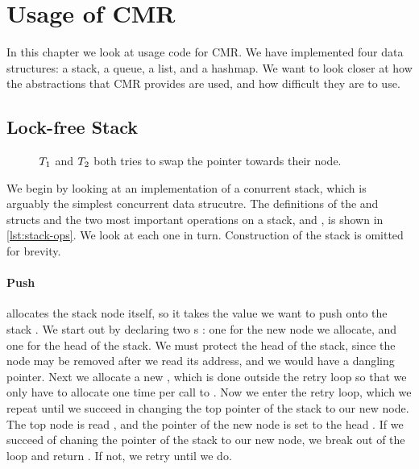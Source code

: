 \chapter{Usage of CMR\label{ch:usage}}

In this chapter we look at usage code for CMR. We have implemented four data structures: a stack, a
queue, a list, and a hashmap. We want to look closer at how the abstractions that CMR provides are
used, and how difficult they are to use.

\section{Lock-free Stack\label{sec:usage-stack}}

\begin{figure}[b]
\centering

\caption{$T\sb{1}$ and $T\sb{2}$ both tries to swap the  pointer towards their
node.}
\end{figure}

We begin by looking at an implementation of a conurrent stack, which is arguably the simplest
concurrent data strucutre. The definitions of the  and  structs and the two
most important operations on a stack,  and , is shown in \cref{lst:stack-ops}.
We look at each one in turn. Construction of the stack is omitted for brevity.

\begin{figure}[ht]

\end{figure}

\subsubsection{Push}

 allocates the stack node itself, so it takes the value we want to push onto the stack
. We start out by declaring two s : one for the new node we
allocate, and one for the head of the stack. We must protect the head of the stack, since the node
may be removed after we read its address, and we would have a dangling pointer.  Next we allocate a
new  , which is done outside the retry loop so that we only have to
allocate one time per call to . Now we enter the retry loop, which we repeat until we
succeed in changing the top pointer of the stack to our new node.
The top node is read , and the  pointer of the new node is set to the head
. If we succeed of chaning the   pointer of the stack to our new node, we
break out of the loop and return . If not, we retry until we do.


